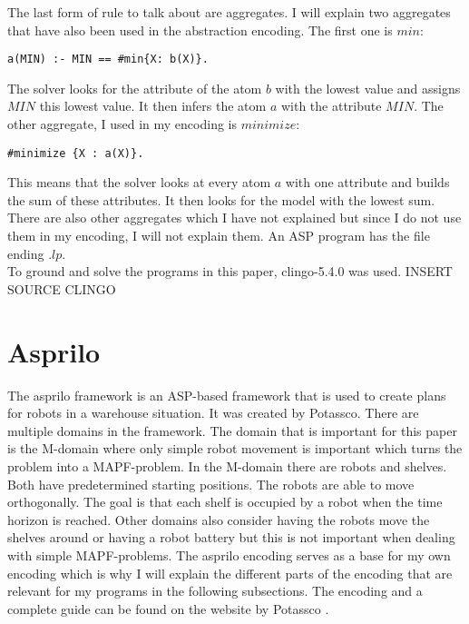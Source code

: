 \documentclass[runningheads]{llncs}
\begin{document}
The last form of rule to talk about are aggregates. I will explain two aggregates that have also been used in the abstraction encoding. The first one is $min$:
\begin{verbatim}
a(MIN) :- MIN == #min{X: b(X)}.
\end{verbatim}
The solver looks for the attribute of the atom $b$ with the lowest value and assigns  $MIN$ this lowest value. It then infers the atom $a$ with the attribute $MIN$. The other aggregate, I used in my encoding is $minimize$:
\begin{verbatim}
#minimize {X : a(X)}.
\end{verbatim}
This means that the solver looks at every atom $a$ with one attribute and builds the sum of these attributes. It then looks for the model with the lowest sum. \\
There are also other aggregates which I have not explained but since I do not use them in my encoding, I will not explain them. An ASP program has the file ending $.lp$.\\
To ground and solve the programs in this paper, clingo-5.4.0 was used. INSERT SOURCE CLINGO



\section{Asprilo}
The asprilo framework is an ASP-based framework that is used to create plans for robots in a warehouse situation. It was created by Potassco. There are multiple domains in the framework. The domain that is important for this paper is the M-domain where only simple robot movement is important which turns the problem into a MAPF-problem. In the M-domain there are robots and shelves. Both have predetermined starting positions. The robots are able to move orthogonally. The goal is that each shelf is occupied by a robot when the time horizon is reached. Other domains also consider having the robots move the shelves around or having a robot battery but this is not important when dealing with simple MAPF-problems. The asprilo encoding serves as a base for my own encoding which is why I will explain the different parts of the encoding that are relevant for my programs in the following subsections. The encoding and a complete guide can be found on the website by Potassco \cite{asprilo}.
\end{document}
